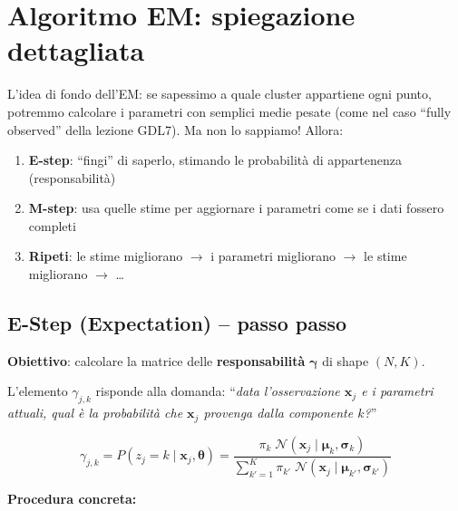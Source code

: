 \documentclass[11pt,a4paper]{article}
\begin{document}
\section{Algoritmo EM: spiegazione dettagliata}

L'idea di fondo dell'EM: se sapessimo a quale cluster appartiene ogni punto, potremmo calcolare i parametri con semplici medie pesate (come nel caso ``fully observed'' della lezione GDL7). Ma non lo sappiamo! Allora:

\begin{enumerate}
    \item \textbf{E-step}: ``fingi'' di saperlo, stimando le probabilit\`a di appartenenza (responsabilit\`a)
    \item \textbf{M-step}: usa quelle stime per aggiornare i parametri come se i dati fossero completi
    \item \textbf{Ripeti}: le stime migliorano $\to$ i parametri migliorano $\to$ le stime migliorano $\to$ \ldots
\end{enumerate}

\subsection{E-Step (Expectation) -- passo passo}

\textbf{Obiettivo}: calcolare la matrice delle \textbf{responsabilit\`a} $\boldsymbol{\gamma}$ di shape $(N, K)$.

L'elemento $\gamma_{j,k}$ risponde alla domanda: ``\emph{data l'osservazione $\mathbf{x}_j$ e i parametri attuali, qual \`e la probabilit\`a che $\mathbf{x}_j$ provenga dalla componente $k$?}''

\begin{equation}
    \boxed{\gamma_{j,k} = P(z_j = k \mid \mathbf{x}_j, \boldsymbol{\theta}) = \frac{\pi_k \;\mathcal{N}(\mathbf{x}_j\mid\boldsymbol{\mu}_k, \boldsymbol{\sigma}_k)}{\displaystyle\sum_{k'=1}^{K} \pi_{k'} \;\mathcal{N}(\mathbf{x}_j\mid\boldsymbol{\mu}_{k'}, \boldsymbol{\sigma}_{k'})}}
    \label{eq:responsibilities}
\end{equation}

\textbf{Procedura concreta:}
\end{document}
